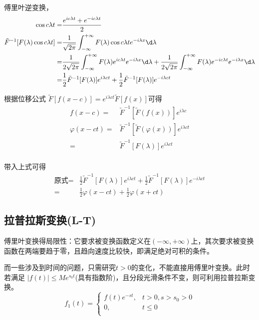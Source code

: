 \documentclass{article}
\begin{document}
傅里叶逆变换，
$$
\begin{aligned}
    \cos c\lambda t = &\frac{e^{ic\lambda t}+e^{-ic\lambda t}}{2} \\
    \tilde{F}^{-1}[F(\lambda )\cos c\lambda t]=&\frac{1}{\sqrt{2\pi }}\int_{-\infty}^{+\infty}F(\lambda )\cos c\lambda t e^{-i\lambda x} \d \lambda \\
    =&\frac{1}{2\sqrt{2\pi }}\int_{-\infty}^{+\infty}F(\lambda )e^{ic\lambda t}e^{-i\lambda x} \d \lambda +\frac{1}{2\sqrt{2\pi }}\int_{-\infty}^{+\infty}F(\lambda )e^{-ic\lambda t}e^{-i\lambda x} \d \lambda \\
    =& \frac{1}{2}\tilde{F}^{-1}[F(\lambda )] e^{i\lambda ct}+\frac{1}{2}\tilde{F}^{-1}[F(\lambda )] e^{-i\lambda ct}
\end{aligned}
$$

根据位移公式 $\tilde{F}[f(x-c)]=e^{i\lambda ct}\tilde{F}[f(x)]$可得
$$
\begin{aligned}
    f(x-c)=&\tilde{F}^{-1}[\tilde{F}(f(x))]e^{i\lambda c} \\
    \varphi (x-ct)=&\tilde{F}^{-1}[\tilde{F}(\varphi (x))] e^{i\lambda ct}\\
    =& \tilde{F}^{-1}[F(\lambda )] e^{i\lambda ct}\\
\end{aligned}
$$

带入上式可得
$$
\begin{aligned}
   \textrm{原式} =& \frac{1}{2}\tilde{F}^{-1}[F(\lambda )] e^{i\lambda ct}+\frac{1}{2}\tilde{F}^{-1}[F(\lambda )] e^{-i\lambda ct} \\
    =& \frac{1}{2}\varphi (x-ct) + \frac{1}{2}\varphi (x+ct)
\end{aligned}
$$

\subsection{拉普拉斯变换(L-T)}
傅里叶变换得局限性：它要求被变换函数定义在$(-\infty,+\infty)$上，其次要求被变换函数在两端要趋于零，且趋向速度比较快，即满足绝对可积的条件。

而一些涉及到时间的问题，只需研究$t>0$的变化，不能直接用傅里叶变换。此时若满足 $|f(t)| \le Me^{s_0t}$(具有指数阶)，且分段光滑条件不变，则可利用拉普拉斯变换。
$$
f_1(t)= 
\begin{cases}
    f(t)e^{-st},& t>0,s>s_0>0 \\
    0,& t \le 0 \\
\end{cases}
$$
\end{document}
